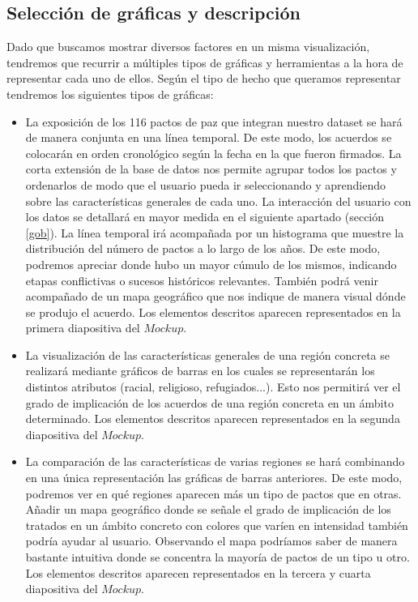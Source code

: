 \documentclass[11pt]{article}
\begin{document}
\subsection{Selección de gráficas y descripción}\label{graf}

Dado que buscamos mostrar diversos factores en un misma visualización, tendremos que recurrir a múltiples tipos de gráficas y herramientas a la hora de representar cada uno de ellos. Según el tipo de hecho que queramos representar tendremos los siguientes tipos de gráficas: 

\begin{itemize}
    \item La exposición de los 116 pactos de paz que integran nuestro dataset se hará de manera conjunta en una línea temporal. De este modo, los acuerdos se colocarán en orden cronológico según la fecha en la que fueron firmados. La corta extensión de la base de datos nos permite agrupar todos los pactos y ordenarlos de modo que el usuario pueda ir seleccionando y aprendiendo sobre las características generales de cada uno. La interacción del usuario con los datos se detallará en mayor medida en el siguiente apartado (sección \ref{gob}). La línea temporal irá acompañada por un histograma que muestre la distribución del número de pactos a lo largo de los años. De este modo, podremos apreciar donde hubo un mayor cúmulo de los mismos, indicando etapas conflictivas o sucesos históricos relevantes. También podrá venir acompañado de un mapa geográfico que nos indique de manera visual dónde se produjo el acuerdo. Los elementos descritos aparecen representados en la primera diapositiva del $\textit{Mockup}$.
    
    \item La visualización de las características generales de una región concreta se realizará mediante gráficos de barras en los cuales se representarán los distintos atributos (racial, religioso, refugiados...). Esto nos permitirá ver el grado de implicación de los acuerdos de una región concreta en un ámbito determinado. Los elementos descritos aparecen representados en la segunda diapositiva del $\textit{Mockup}$.
    
    \item La comparación de las características de varias regiones se hará combinando en una única representación las gráficas de barras anteriores. De este modo, podremos ver en qué regiones aparecen más un tipo de pactos que en otras. Añadir un mapa geográfico donde se señale el grado de implicación de los tratados en un ámbito concreto con colores que varíen en intensidad también podría ayudar al usuario. Observando el mapa podríamos saber de manera bastante intuitiva donde se concentra la mayoría de pactos de un tipo u otro. Los elementos descritos aparecen representados en la tercera y cuarta diapositiva del $\textit{Mockup}$.
    

\end{itemize}
\end{document}

